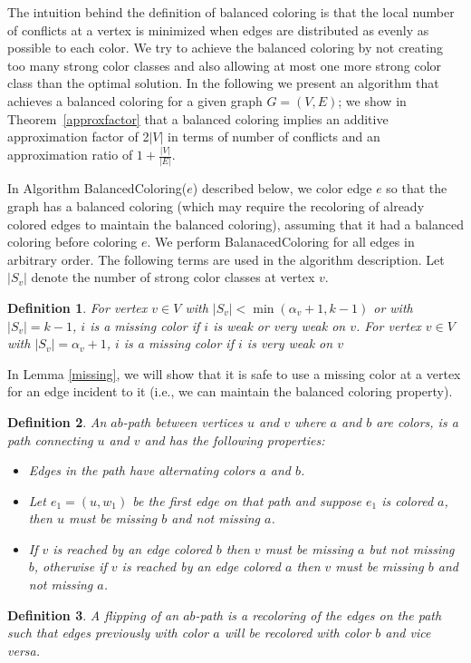 \documentclass[titlepage, 11pt]{article}
\newtheorem{definition}{Definition}
\begin{document}
The intuition behind the definition of balanced coloring is that the local number of conflicts at a vertex is minimized when
edges are distributed as evenly as possible to each color. We try to achieve the balanced coloring
by not creating too many strong color classes and also allowing at most one more strong color class than the optimal solution.
In the following we present an algorithm that achieves a balanced coloring for a given graph $G = (V, E)$;  we show in Theorem~\ref{approxfactor} that a balanced coloring implies an additive approximation factor of 2$|V|$ in terms of number of conflicts and an approximation ratio of $1 + \frac{|V|}{|E|}$. 

In Algorithm {\sc BalancedColoring}($e$) described below, we color edge $e$ so that the graph has a balanced coloring 
(which may require the recoloring of already colored edges to maintain the balanced coloring),
assuming that it had a balanced coloring before coloring $e$.
We perform {\sc BalanacedColoring} for all edges in arbitrary order.
The following terms are used in the algorithm description.
Let $|S_v|$ denote the number of strong color classes at vertex $v$.
\begin{definition}\label{def:weak}
For vertex $v \in V$ with $|S_v| < \min(\alpha_v + 1, k - 1)$ or with $|S_v| = k - 1$, $i$ is a missing color if $i$ is weak or very weak on $v$.  For vertex $v \in V$ with $|S_v| = \alpha_v + 1$, $i$ is a missing color if $i$ is very weak on $v$
\end{definition}

In Lemma \ref{missing}, we will show that it is safe to use a missing color at a vertex 
for an edge incident to it (i.e., we can maintain the balanced coloring property).

\begin{definition}\label{def:path}
An \emph{$ab$-path} between vertices $u$ and $v$ where $a$ and $b$ are colors, is a path connecting $u$ and $v$ and has the following properties:
\begin{itemize}
\item Edges in the path have alternating colors $a$ and $b$. 
\item Let $e_1 = (u,w_1)$ be the first edge on that path and suppose $e_1$ is colored $a$, then $u$ must be missing $b$ and not missing $a$. 
\item If $v$ is reached by an edge colored $b$ then $v$ must be missing $a$ but not missing $b$, otherwise if $v$ is reached by an edge colored $a$ then $v$ must be missing $b$ and not missing $a$.
\end{itemize}  
\end{definition}
\begin{definition}
A flipping of an $ab$-path is a recoloring of the edges on the path such that edges previously with color $a$ will be recolored with color $b$ and vice versa. 
\end{definition}
\end{document}
